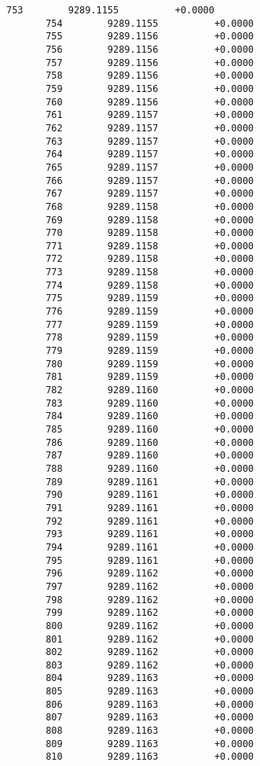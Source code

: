 \documentclass[11pt]{article}
\begin{document}
\begin{Verbatim}[commandchars=\\\{\}]
       753        9289.1155          +0.0000
       754        9289.1155          +0.0000
       755        9289.1156          +0.0000
       756        9289.1156          +0.0000
       757        9289.1156          +0.0000
       758        9289.1156          +0.0000
       759        9289.1156          +0.0000
       760        9289.1156          +0.0000
       761        9289.1157          +0.0000
       762        9289.1157          +0.0000
       763        9289.1157          +0.0000
       764        9289.1157          +0.0000
       765        9289.1157          +0.0000
       766        9289.1157          +0.0000
       767        9289.1157          +0.0000
       768        9289.1158          +0.0000
       769        9289.1158          +0.0000
       770        9289.1158          +0.0000
       771        9289.1158          +0.0000
       772        9289.1158          +0.0000
       773        9289.1158          +0.0000
       774        9289.1158          +0.0000
       775        9289.1159          +0.0000
       776        9289.1159          +0.0000
       777        9289.1159          +0.0000
       778        9289.1159          +0.0000
       779        9289.1159          +0.0000
       780        9289.1159          +0.0000
       781        9289.1159          +0.0000
       782        9289.1160          +0.0000
       783        9289.1160          +0.0000
       784        9289.1160          +0.0000
       785        9289.1160          +0.0000
       786        9289.1160          +0.0000
       787        9289.1160          +0.0000
       788        9289.1160          +0.0000
       789        9289.1161          +0.0000
       790        9289.1161          +0.0000
       791        9289.1161          +0.0000
       792        9289.1161          +0.0000
       793        9289.1161          +0.0000
       794        9289.1161          +0.0000
       795        9289.1161          +0.0000
       796        9289.1162          +0.0000
       797        9289.1162          +0.0000
       798        9289.1162          +0.0000
       799        9289.1162          +0.0000
       800        9289.1162          +0.0000
       801        9289.1162          +0.0000
       802        9289.1162          +0.0000
       803        9289.1162          +0.0000
       804        9289.1163          +0.0000
       805        9289.1163          +0.0000
       806        9289.1163          +0.0000
       807        9289.1163          +0.0000
       808        9289.1163          +0.0000
       809        9289.1163          +0.0000
       810        9289.1163          +0.0000

\end{Verbatim}
\end{document}

